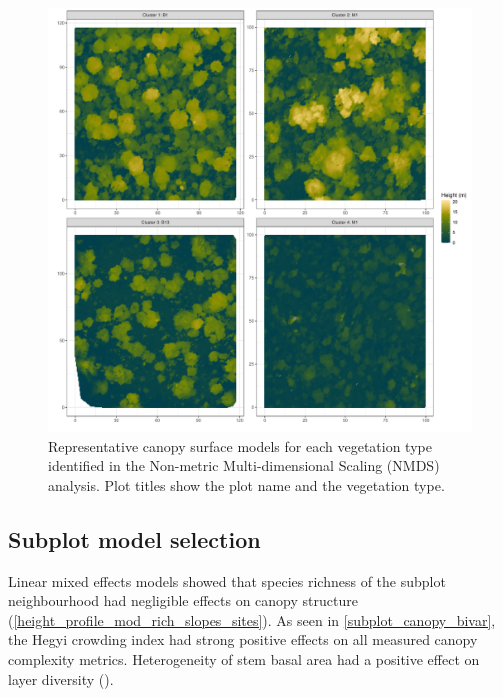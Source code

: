 \documentclass[11pt,a4paper]{article}
\begin{document}
\begin{figure}
	\includegraphics[width=\linewidth]{veg_type_tile}
	\caption{Representative canopy surface models for each vegetation type identified in the Non-metric Multi-dimensional Scaling (NMDS) analysis. Plot titles show the plot name and the vegetation type.}
	\label{veg_type_tile}
\end{figure}

\subsection{Subplot model selection}

Linear mixed effects models showed that species richness of the subplot neighbourhood had negligible effects on canopy structure (\autoref{height_profile_mod_rich_slopes_sites}). As seen in \autoref{subplot_canopy_bivar}, the Hegyi crowding index had strong positive effects on all measured canopy complexity metrics. Heterogeneity of stem basal area had a positive effect on layer diversity (). 
\end{document}
